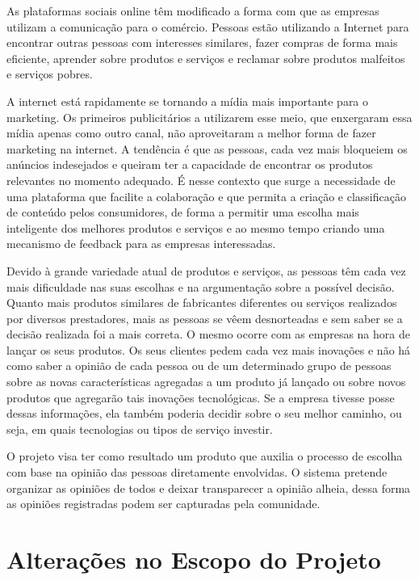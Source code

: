 As plataformas sociais online têm modificado a forma com que as empresas utilizam a comunicação para o comércio. Pessoas estão utilizando a Internet para encontrar outras pessoas com interesses similares, fazer compras de forma mais eficiente, aprender sobre produtos e serviços e reclamar sobre produtos malfeitos e serviços pobres\cite{marketing_social_web}.

 A internet está rapidamente se tornando a mídia mais importante para o marketing. Os primeiros publicitários a utilizarem esse meio, que enxergaram essa mídia apenas como outro canal, não aproveitaram a melhor forma de fazer marketing na internet. A tendência é que as pessoas, cada vez mais bloqueiem os anúncios indesejados e queiram ter a capacidade de encontrar os produtos relevantes no momento adequado. É nesse contexto que surge a necessidade de uma plataforma que facilite a colaboração e que permita a criação e classificação de conteúdo pelos consumidores, de forma a permitir uma escolha mais inteligente dos melhores produtos e serviços e ao mesmo tempo criando uma mecanismo de feedback para as empresas interessadas.

 Devido à grande variedade atual de produtos e serviços, as pessoas têm cada vez mais dificuldade nas suas escolhas e na argumentação sobre a possível decisão. Quanto mais produtos similares de fabricantes diferentes ou serviços realizados por diversos prestadores, mais as pessoas se vêem desnorteadas e sem saber se a decisão realizada foi a mais correta. O mesmo ocorre com as empresas na hora de lançar os seus produtos. Os seus clientes pedem cada vez mais inovações e não há como saber a opinião de cada pessoa ou de um determinado grupo de pessoas sobre as novas características agregadas a um produto já lançado ou sobre novos produtos que agregarão tais inovações tecnológicas. Se a empresa tivesse posse dessas informações, ela também poderia decidir sobre o seu melhor caminho, ou seja, em quais tecnologias ou tipos de serviço investir.

 O projeto visa ter como resultado um produto que auxilia o processo de escolha com base na opinião das pessoas diretamente envolvidas. O sistema pretende organizar as opiniões de todos e deixar transparecer a opinião alheia, dessa forma as opiniões registradas podem ser capturadas pela comunidade.

\section{Alterações no Escopo do Projeto}

